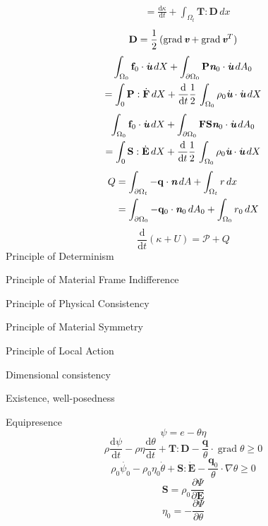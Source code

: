 \documentclass[letterpaper,10pt]{article}
\DeclareMathOperator*{\tgrad}{grad}
\def\mathbi#1{\textbf{\em #1}}
\def\d{\mathrm{d}}
\def\half{\frac{1}{2}\,}
\def\u{\mathbi{u}}
\def\v{\mathbi{v}}
\def\n{\mathbi{n}}
\def\F{\mathbf{F}}
\def\E{\mathbf{E}}
\begin{document}
\begin{multicols}{3}
\begin{align*}
&=\frac{\d \kappa}{\d
t}+\int_{\Omega_t}\mathbf{T}:\mathbf{D}\,dx
\end{align*}
\begin{equation*}
\mathbf{D}=\half(\tgrad\v+\tgrad\v^T)
\end{equation*}
\begin{multline*}
\int_{\Omega_0}\mathbf{f}_0\cdot\dot{\u}\,dX
+\int_{\partial\Omega_0}\mathbf{P}\n_0\cdot\dot{\u}\,dA_0\\
=\int_0\mathbf{P}:\dot{\F}\,dX+\frac{\d}{\d
t}\half\int_{\Omega_0}\rho_0\dot{\u}\cdot\dot{\u}\,dX
\end{multline*}
\begin{multline*}
\int_{\Omega_0}\mathbf{f}_0\cdot\dot{\u}\,dX
+\int_{\partial\Omega_0}\mathbf{FS}\n_0\cdot\dot{\u}\,dA_0\\
=\int_0\mathbf{S}:\dot{\E}\,dX
+\frac{\d}{\d t}\half\int_{\Omega_0}\rho_0\dot{\u}\cdot\dot{\u}\,dX
\end{multline*}
\begin{align*}
Q&=\int_{\partial\Omega_t}-\mathbf{q}\cdot\n\,dA+\int_{\Omega_t}r\,dx\\
&=\int_{\partial\Omega_0}-\mathbf{q}_0\cdot\n_0\,dA_0+\int_{\Omega_0}r_0\,dX
\end{align*}
\begin{equation*}
\frac{\d}{\d t}(\kappa+U)=\mathcal{P}+Q
\end{equation*}
Principle of Determinism

Principle of Material Frame Indifference

Principle of Physical Consistency

Principle of Material Symmetry

Principle of Local Action

Dimensional consistency

Existence, well-posedness

Equipresence
\begin{equation*}
\psi=e-\theta\eta
\end{equation*}
\begin{equation*}
\rho\frac{\d\psi}{\d t}-\rho\eta\frac{\d\theta}{\d t}+\mathbf{T}:\mathbf{D}
-\frac{\mathbf{q}}{\theta}\cdot\tgrad\theta\geq0
\end{equation*}
\begin{equation*}
\rho_0\dot{\psi_0}-\rho_0\eta_0\dot{\theta}+\mathbf{S}:\dot{\mathbf{E}}
-\frac{\mathbf{q}_0}{\theta}\cdot\nabla\theta\geq0
\end{equation*}
\begin{equation*}
\mathbf{S}=\rho_0\frac{\partial\Psi}{\partial\mathbf{E}}
\end{equation*}
\begin{equation*}
\eta_0=-\frac{\partial\Psi}{\partial\theta}
\end{equation*}
\end{multicols}
\end{document}
